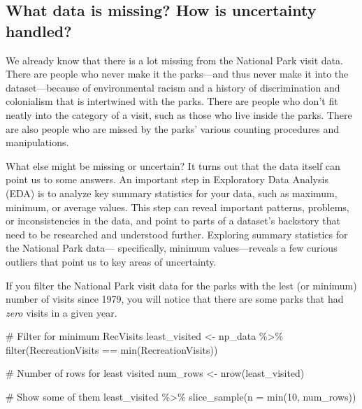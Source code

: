 \documentclass[
  letterpaper,
  DIV=11,
  numbers=noendperiod]{scrartcl}
\newenvironment{Shaded}{\begin{snugshade}}{\end{snugshade}}
\newcommand{\AttributeTok}[1]{\textcolor[rgb]{0.40,0.45,0.13}{#1}}
\newcommand{\CommentTok}[1]{\textcolor[rgb]{0.37,0.37,0.37}{#1}}
\newcommand{\DecValTok}[1]{\textcolor[rgb]{0.68,0.00,0.00}{#1}}
\newcommand{\FunctionTok}[1]{\textcolor[rgb]{0.28,0.35,0.67}{#1}}
\newcommand{\NormalTok}[1]{\textcolor[rgb]{0.00,0.23,0.31}{#1}}
\newcommand{\OtherTok}[1]{\textcolor[rgb]{0.00,0.23,0.31}{#1}}
\newcommand{\SpecialCharTok}[1]{\textcolor[rgb]{0.37,0.37,0.37}{#1}}
\begin{document}
\subsection{What data is missing? How is uncertainty
handled?}\label{what-data-is-missing-how-is-uncertainty-handled}

We already know that there is a lot missing from the National Park visit
data. There are people who never make it the parks---and thus never make
it into the dataset---because of environmental racism and a history of
discrimination and colonialism that is intertwined with the parks. There
are people who don't fit neatly into the category of a visit, such as
those who live inside the parks. There are also people who are missed by
the parks' various counting procedures and manipulations.

What else might be missing or uncertain? It turns out that the data
itself can point us to some answers. An important step in Exploratory
Data Analysis (EDA) is to analyze key summary statistics for your data,
such as maximum, minimum, or average values. This step can reveal
important patterns, problems, or inconsistencies in the data, and point
to parts of a dataset's backstory that need to be researched and
understood further. Exploring summary statistics for the National Park
data--- specifically, minimum values---reveals a few curious outliers
that point us to key areas of uncertainty.

If you filter the National Park visit data for the parks with the lest
(or minimum) number of visits since 1979, you will notice that there are
some parks that had \emph{zero} visits in a given year.

\begin{Shaded}
\begin{Highlighting}[]
\CommentTok{\# Filter for minimum RecVisits}
\NormalTok{least\_visited }\OtherTok{\textless{}{-}}\NormalTok{ np\_data }\SpecialCharTok{\%\textgreater{}\%} \FunctionTok{filter}\NormalTok{(RecreationVisits }\SpecialCharTok{==} \FunctionTok{min}\NormalTok{(RecreationVisits))}

\CommentTok{\# Number of rows for least visited}
\NormalTok{num\_rows }\OtherTok{\textless{}{-}} \FunctionTok{nrow}\NormalTok{(least\_visited)}

\CommentTok{\# Show some of them}
\NormalTok{least\_visited  }\SpecialCharTok{\%\textgreater{}\%} \FunctionTok{slice\_sample}\NormalTok{(}\AttributeTok{n =} \FunctionTok{min}\NormalTok{(}\DecValTok{10}\NormalTok{, num\_rows))}
\end{Highlighting}
\end{Shaded}
\end{document}
